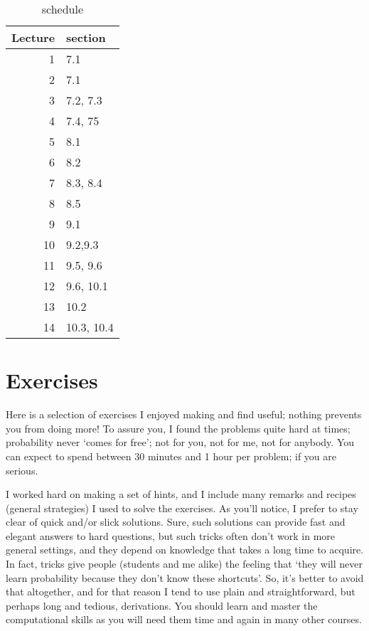 \documentclass[a4paper]{article}
\theoremstyle{definition}
\newcommand{\1}[1]{\,I_{#1}} %
\begin{document}
\begin{table}[htbp]
\caption{schedule}
\centering
\begin{tabular}{rl}
Lecture & section\\
\hline
1 & 7.1\\
2 & 7.1\\
\hline
3 & 7.2, 7.3\\
4 & 7.4, 75\\
\hline
5 & 8.1\\
6 & 8.2\\
\hline
7 & 8.3, 8.4\\
8 & 8.5\\
\hline
9 & 9.1\\
10 & 9.2,9.3\\
\hline
11 & 9.5, 9.6\\
12 & 9.6, 10.1\\
\hline
13 & 10.2\\
14 & 10.3, 10.4\\
\hline
\end{tabular}
\end{table}


\section{Exercises}
\label{sec:orgb881c86}

Here is a selection of exercises I enjoyed making and find useful; nothing prevents you from doing more!
To assure you, I found the problems quite hard at times; probability never `comes for free'; not for you, not for me, not for anybody.
You can expect to spend between 30 minutes and 1 hour per problem; if you are serious.

I worked hard on making a set of hints, and I include many remarks and recipes (general strategies) I used to solve the exercises.
As you'll notice, I prefer to stay clear of quick and/or slick solutions.
Sure, such solutions can provide fast and elegant answers to hard questions, but such tricks often don't work in more general settings, and they depend on knowledge that takes a long time to acquire. In fact,  tricks give people (students and me alike) the feeling that `they will never learn probability because they don't know these shortcuts'. So, it's better to avoid that altogether, and for that reason  I tend to use plain and straightforward, but perhaps long and tedious, derivations.
You should learn and master the computational skills as you will need them time and again in many other courses.
\end{document}
